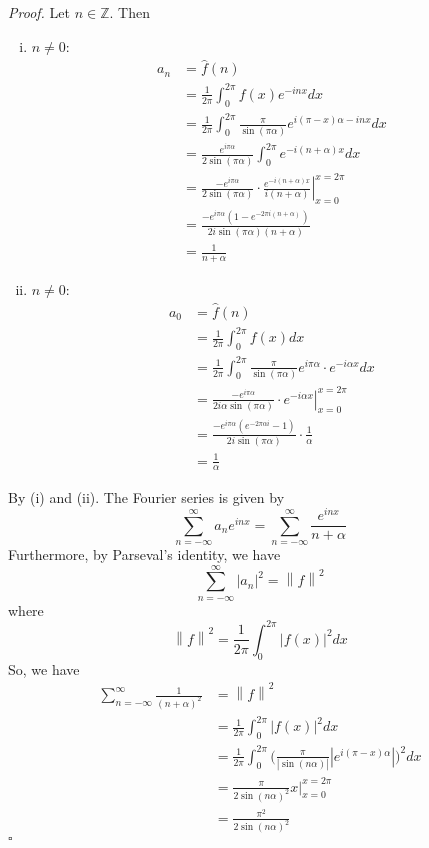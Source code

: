 \documentclass[12pt]{article}
\newenvironment{proof}{\textit{Proof.}}{\hfill$\square$}
\newcommand{\norm}[1]{\left\lVert#1\right\rVert}
\newcommand*\Eval[3]{\left.#1\right\rvert_{#2}^{#3}}
\newcommand{\bbz}{\mathbb{Z}}
\begin{document}
\begin{proof}
    Let $n\in\bbz$. Then
    \begin{enumerate}[(i)]
        \item $n\ne0$:
        \begin{align*}
            a_n&=\hat{f}(n) \\
            &=\frac{1}{2\pi}\int_{0}^{2\pi}f(x)e^{-inx}dx\\
            &=\frac{1}{2\pi}\int_{0}^{2\pi}\frac{\pi}{\sin(\pi\alpha)}e^{i(\pi-x)\alpha-inx}dx\\
            &=\frac{e^{i\pi\alpha}}{2\sin(\pi\alpha)}\int_{0}^{2\pi}e^{-i(n+\alpha)x}dx\\
            &=\frac{-e^{i\pi\alpha}}{2\sin(\pi\alpha)}\cdot\Eval{\frac{e^{-i(n+\alpha)x}}{i(n+\alpha)}}{x=0}{x=2\pi}\\
            &=\frac{-e^{i\pi\alpha}(1-e^{-2\pi i(n+\alpha)})}{2i\sin(\pi\alpha)(n+\alpha)} \\
            &=\frac{1}{n+\alpha}
        \end{align*}
        \item $n\ne0$:
        \begin{align*}
            a_0&=\hat{f}(n) \\
            &=\frac{1}{2\pi}\int_{0}^{2\pi}f(x)dx\\
            &=\frac{1}{2\pi}\int_{0}^{2\pi}\frac{\pi}{\sin(\pi\alpha)}e^{i\pi\alpha}\cdot e^{-i\alpha x}dx\\
            &=\frac{-e^{i\pi\alpha}}{2i\alpha\sin(\pi\alpha)}\cdot\Eval{e^{-i\alpha x}}{x=0}{x=2\pi}\\
            &=\frac{-e^{i\pi\alpha}(e^{-2\pi\alpha i}-1)}{2i\sin(\pi\alpha)}\cdot\frac{1}{\alpha}\\
            &=\frac{1}{\alpha}
        \end{align*}
    \end{enumerate}
    By (i) and (ii). The Fourier series is given by
    \begin{equation*}
        \sum_{n=-\infty}^{\infty}a_ne^{inx}=\sum_{n=-\infty}^{\infty}\frac{e^{inx}}{n+\alpha}
    \end{equation*}
    Furthermore, by Parseval's identity, we have
    \begin{equation*}
        \sum_{n=-\infty}^{\infty}|a_n|^2=\norm{f}^2
    \end{equation*}
    where
    \begin{equation*}
        \norm{f}^2=\frac{1}{2\pi}\int_{0}^{2\pi}|f(x)|^2dx
    \end{equation*}
    So, we have
    \begin{align*}
        \sum_{n=-\infty}^{\infty}\frac{1}{(n+\alpha)^2}&=\norm{f}^2\\
        &=\frac{1}{2\pi}\int_{0}^{2\pi}|f(x)|^2dx\\
        &=\frac{1}{2\pi}\int_{0}^{2\pi}\Big(\frac{\pi}{|\sin(n\alpha)|}|e^{i(\pi-x)\alpha}|\Big)^2dx\\
        &=\frac{\pi}{2\sin(n\alpha)^2}\Eval{x}{x=0}{x=2\pi}\\
        &=\frac{\pi^2}{2\sin(n\alpha)^2}
    \end{align*}
\end{proof}
\newpage
\end{document}
